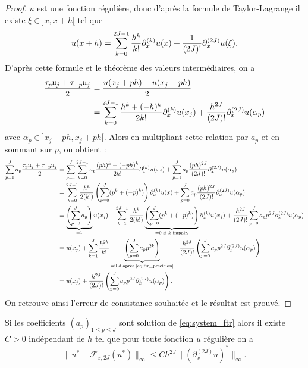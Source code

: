 \begin{proof}
$u$ est une fonction régulière, donc d'après la formule de Taylor-Lagrange il existe $\xi \in ]x,x+h[$ tel que
\begin{equation}
u(x+h) = \displaystyle\sum\limits_{k=0}^{2J-1} \dfrac{h^k}{k!} \partial_x^{(k)} u(x) +\dfrac{1}{(2J)!} \partial_x^{(2J)}u(\xi).
\end{equation}
D'après cette formule et le théorème des valeurs intermédiaires, on a
\begin{align*}
\dfrac{\tau_p \mathfrak{u}_j + \tau_{-p} \mathfrak{u}_j}{2} & = \dfrac{u(x_j + ph) - u(x_j-ph)}{2} \\
& = \displaystyle\sum\limits_{k=0}^{2J-1} \dfrac{h^k + (-h)^k}{2k!} \partial_x^{(k)}u(x_j) + \dfrac{h^{2J}}{(2J)!} \partial_x^{(2J)} u(\alpha_p)
\end{align*}
avec $\alpha_p \in ]x_j - ph, x_j + ph[$. Alors en multipliant cette relation par $a_p$ et en sommant sur $p$, on obtient :
\begin{align*}
\displaystyle\sum\limits_{p=1}^J a_p \dfrac{\tau_p \mathfrak{u}_j + \tau_{-p} \mathfrak{u}_j}{2} & = \displaystyle\sum\limits_{p=1}^J \displaystyle\sum\limits_{k=0}^{2J-1} a_p \dfrac{(ph)^k + (-ph)^k}{2k!} \partial_x^{(k)}u(x_j) + \displaystyle\sum\limits_{p=1}^J a_p \dfrac{(ph)^{2J}}{(2J)!} \partial_x^{(2J)}u(\alpha_p) \\
& = \displaystyle\sum\limits_{k=0}^{2J-1} \dfrac{h^k}{2 (k!)} \left( \displaystyle\sum\limits_{p=0}^J (p^k + (-p)^k) \right) \partial_x^{(k)} u(x) + \displaystyle\sum\limits_{p=0}^J a_p \dfrac{(ph)^{2J}}{(2J)!} \partial_x^{(2J)}u(\alpha_p) \\
& = \underbrace{ \left( \displaystyle\sum\limits_{p=0}^J a_p \right)}_{=1}u(x_j) + 
\displaystyle\sum\limits_{k=1}^{2J-1} \dfrac{h^k}{2(k!)} \underbrace{\left( \displaystyle\sum\limits_{p=0}^J (p^k + (-p)^k)  \right)}_{=0 \text{ si } k \text{ impair.}} \partial_x^{(k)}u(x_j) + \dfrac{h^{2J}}{(2J)!} \displaystyle\sum\limits_{p=0}^Ja_p p^{2J} \partial_x^{(2J)}u(\alpha_p)  \\
& = u(x_j) + \displaystyle\sum\limits_{k=1}^J \dfrac{h^{2k}}{k!} \underbrace{\left( \displaystyle\sum\limits_{p=0}^J a_p p^{2k} \right)}_{ = 0 \text{ d'après \eqref{eq:ftr_precision}}}
+ \dfrac{h^{2J}}{(2J)!} \left( \displaystyle\sum\limits_{p=0}^J a_p p^{2J} \partial_x^{(2J)}u(\alpha_p) \right) \\
& = u(x_j) + \dfrac{h^{2J}}{(2J)!} \left( \displaystyle\sum\limits_{p=0}^J a_p p^{2J} \partial_x^{(2J)}u(\alpha_p) \right).
\end{align*}
On retrouve ainsi l'erreur de consistance souhaitée et le résultat est prouvé.
\end{proof}

\begin{corollaire}
Si les coefficients $(a_p)_{1 \leq p \leq J}$ sont solution de \eqref{eq:system_ftr} alors il existe $C>0$ indépendant de $h$ tel que pour toute fonction $u$ régulière on a 
\begin{equation}
\| u^* -  \mathcal{F}_{x,2J}(u^*) \|_{\infty} \leq C h^{2J} \| (\partial_x^{(2J)}u)^* \|_{\infty}.
\end{equation}
\end{corollaire}

